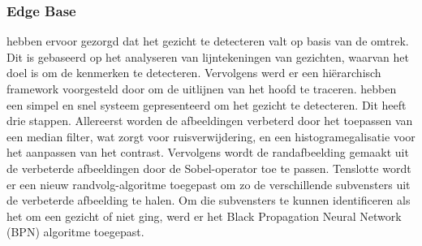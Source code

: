 \subsubsection{Edge Base}
\textcite{sakai1972} hebben ervoor gezorgd dat het gezicht te detecteren valt op basis van de omtrek. Dit is gebaseerd op het analyseren van lijntekeningen van gezichten, waarvan het doel is om de kenmerken te detecteren. Vervolgens werd er een hiërarchisch framework voorgesteld door \textcite{CRAW1987} om de uitlijnen van het hoofd te traceren. \textcite{anila2010} hebben een simpel en snel systeem gepresenteerd om het gezicht te detecteren. Dit heeft drie stappen. Allereerst worden de afbeeldingen verbeterd door het toepassen van een median filter, wat zorgt voor ruisverwijdering, en een histogramegalisatie voor het aanpassen van het contrast. Vervolgens wordt de randafbeelding gemaakt uit de verbeterde afbeeldingen door de Sobel-operator toe te passen. Tenslotte wordt er een nieuw randvolg-algoritme toegepast om zo de verschillende subvensters uit de verbeterde afbeelding te halen. Om die subvensters te kunnen identificeren als het om een gezicht of niet ging, werd er het Black Propagation Neural Network (BPN) algoritme toegepast.

